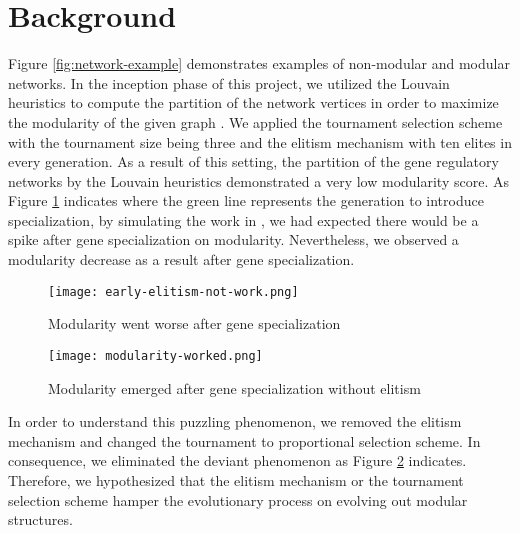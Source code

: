 \section{Background}
Figure \ref{fig:network-example} demonstrates examples of non-modular and modular networks.  
In the inception phase of this project, we utilized the Louvain heuristics to compute the partition of the network vertices in order to maximize the modularity of the given graph \cite{blondel2008fast}. We applied the tournament selection scheme with the tournament size being three and the elitism mechanism with ten elites in every generation. As a result of this setting, the partition of the gene regulatory networks by the Louvain heuristics demonstrated a very low modularity score. As Figure \ref{fig:early-modularity-not-work} indicates where the green line represents the generation to introduce specialization, by simulating the work in \cite{espinosa2010specialization}, we had expected there would be a spike after gene specialization on modularity. Nevertheless, we observed a modularity decrease as a result after gene specialization. 
\begin{figure}[h!]
	\centering
	\texttt{[image: early-elitism-not-work.png]}
	\caption{Modularity went worse after gene specialization}
	\label{fig:early-modularity-not-work}
\end{figure}
\begin{figure}[h!]
	\centering
	\texttt{[image: modularity-worked.png]}
	\caption{Modularity emerged after gene specialization without elitism}
	\label{fig:modularity-worked-without-elitism}
\end{figure}
In order to understand this puzzling phenomenon, we removed the elitism mechanism and changed the tournament to proportional selection scheme. In consequence, we eliminated the deviant phenomenon as Figure \ref{fig:modularity-worked-without-elitism} indicates. Therefore, we hypothesized that the elitism mechanism or the tournament selection scheme hamper the evolutionary process on evolving out modular structures. 

